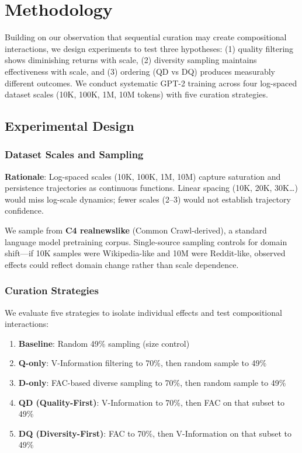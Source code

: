 \section{Methodology}

Building on our observation that sequential curation may create compositional interactions, we design experiments to test three hypotheses: (1) quality filtering shows diminishing returns with scale, (2) diversity sampling maintains effectiveness with scale, and (3) ordering (QD vs DQ) produces measurably different outcomes. We conduct systematic GPT-2 training across four log-spaced dataset scales (10K, 100K, 1M, 10M tokens) with five curation strategies.

\subsection{Experimental Design}

\subsubsection{Dataset Scales and Sampling}

\textbf{Rationale}: Log-spaced scales (10K, 100K, 1M, 10M) capture saturation and persistence trajectories as continuous functions. Linear spacing (10K, 20K, 30K\ldots) would miss log-scale dynamics; fewer scales (2--3) would not establish trajectory confidence.

We sample from \textbf{C4 realnewslike} (Common Crawl-derived), a standard language model pretraining corpus. Single-source sampling controls for domain shift---if 10K samples were Wikipedia-like and 10M were Reddit-like, observed effects could reflect domain change rather than scale dependence.

\subsubsection{Curation Strategies}

We evaluate five strategies to isolate individual effects and test compositional interactions:

\begin{enumerate}
\item \textbf{Baseline}: Random 49\% sampling (size control)
\item \textbf{Q-only}: V-Information filtering to 70\%, then random sample to 49\%
\item \textbf{D-only}: FAC-based diverse sampling to 70\%, then random sample to 49\%
\item \textbf{QD (Quality-First)}: V-Information to 70\%, then FAC on that subset to 49\%
\item \textbf{DQ (Diversity-First)}: FAC to 70\%, then V-Information on that subset to 49\%
\end{enumerate}

